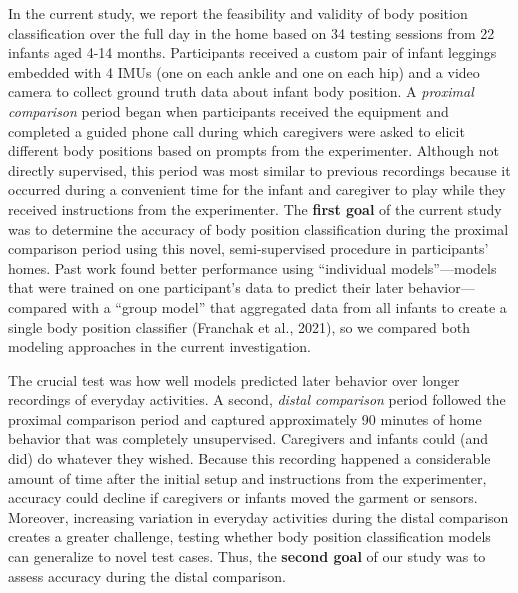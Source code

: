 \documentclass[
  man]{apa6}
\begin{document}
In the current study, we report the feasibility and validity of body position classification over the full day in the home based on 34 testing sessions from 22 infants aged 4-14 months. Participants received a custom pair of infant leggings embedded with 4 IMUs (one on each ankle and one on each hip) and a video camera to collect ground truth data about infant body position. A \emph{proximal comparison} period began when participants received the equipment and completed a guided phone call during which caregivers were asked to elicit different body positions based on prompts from the experimenter. Although not directly supervised, this period was most similar to previous recordings because it occurred during a convenient time for the infant and caregiver to play while they received instructions from the experimenter. The \textbf{first goal} of the current study was to determine the accuracy of body position classification during the proximal comparison period using this novel, semi-supervised procedure in participants' homes. Past work found better performance using ``individual models''---models that were trained on one participant's data to predict their later behavior---compared with a ``group model'' that aggregated data from all infants to create a single body position classifier (Franchak et al., 2021), so we compared both modeling approaches in the current investigation.

The crucial test was how well models predicted later behavior over longer recordings of everyday activities. A second, \emph{distal comparison} period followed the proximal comparison period and captured approximately 90 minutes of home behavior that was completely unsupervised. Caregivers and infants could (and did) do whatever they wished. Because this recording happened a considerable amount of time after the initial setup and instructions from the experimenter, accuracy could decline if caregivers or infants moved the garment or sensors. Moreover, increasing variation in everyday activities during the distal comparison creates a greater challenge, testing whether body position classification models can generalize to novel test cases. Thus, the \textbf{second goal} of our study was to assess accuracy during the distal comparison.
\end{document}
